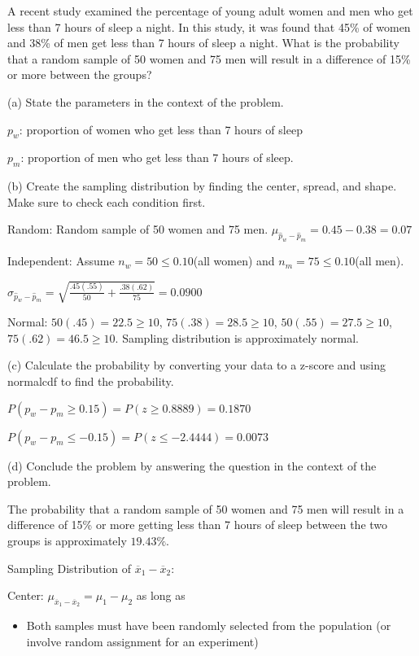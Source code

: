 \documentclass[../stats.tex]{subfiles}
\begin{document}
\pagebreak
\begin{example}
    A recent study examined the percentage of young adult women and men who get less than 7 hours of sleep a night. In this study, it was found that 45\% of women and 38\% of men get less than 7 hours of sleep a night. What is the probability that a random sample of 50 women and 75 men will result in a difference of 15\% or more between the groups?

    (a) State the parameters in the context of the problem.

    $p_w$: proportion of women who get less than 7 hours of sleep

    $p_m$: proportion of men who get less than 7 hours of sleep.

    (b) Create the sampling distribution by finding the center, spread, and shape. Make sure to check each condition first.

    Random: Random sample of 50 women and 75 men. $\mu_{\hat{p}_w-\hat{p}_m}=0.45-0.38=0.07$

    Independent: Assume $n_w=50\leq 0.10$(all women) and $n_m=75\leq 0.10$(all men).

    $\sigma_{\hat{p}_w-\hat{p}_m}=\sqrt{\frac{.45(.55)}{50}+\frac{.38(.62)}{75}}=0.0900$

    Normal: $50(.45)=22.5\geq 10$, $75(.38)=28.5\geq 10$, $50(.55)=27.5\geq 10$, $75(.62)=46.5\geq 10$. Sampling distribution is approximately normal.

    (c) Calculate the probability by converting your data to a z-score and using normalcdf to find the probability.

    $P(p_w-p_m\geq 0.15) = P(z\geq 0.8889) = 0.1870$

    $P(p_w-p_m\leq -0.15)=P(z\leq -2.4444) = 0.0073$

    (d) Conclude the problem by answering the question in the context of the problem.

    The probability that a random sample of 50 women and 75 men will result in a difference of 15\% or more getting less than 7 hours of sleep between the two groups is approximately $19.43\%$.
\end{example}

Sampling Distribution of $\overline{x}_1-\overline{x}_2$:

Center: $\mu_{\overline{x}_1-\overline{x}_2}=\mu_1-\mu_2$ as long as 
\begin{itemize}
    \item Both samples must have been randomly selected from the population (or involve random assignment for an experiment)
\end{itemize}
\end{document}
